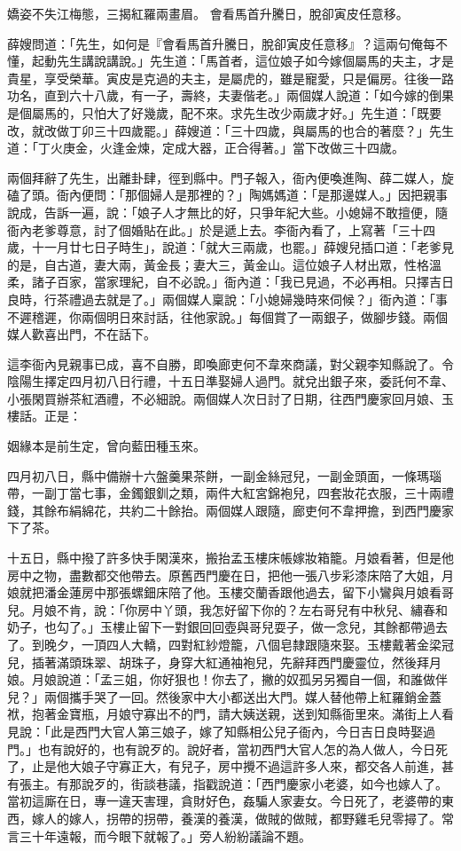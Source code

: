\begin{showcontents}{}
嬌姿不失江梅態，三揭紅羅兩畫眉。
會看馬首升騰日，脫卻寅皮任意移。

薛嫂問道：「先生，如何是『會看馬首升騰日，脫卻寅皮任意移』？這兩句俺每不懂，起動先生講說講說。」先生道：「馬首者，這位娘子如今嫁個屬馬的夫主，才是貴星，享受榮華。寅皮是克過的夫主，是屬虎的，雖是寵愛，只是偏房。往後一路功名，直到六十八歲，有一子，壽終，夫妻偕老。」兩個媒人說道：「如今嫁的倒果是個屬馬的，只怕大了好幾歲，配不來。求先生改少兩歲才好。」先生道：「既要改，就改做丁卯三十四歲罷。」薛嫂道：「三十四歲，與屬馬的也合的著麼？」先生道：「丁火庚金，火逢金煉，定成大器，正合得著。」當下改做三十四歲。

兩個拜辭了先生，出離卦肆，徑到縣中。門子報入，衙內便喚進陶、薛二媒人，旋磕了頭。衙內便問：「那個婦人是那裡的？」陶媽媽道：「是那邊媒人。」因把親事說成，告訴一遍，說：「娘子人才無比的好，只爭年紀大些。小媳婦不敢擅便，隨衙內老爹尊意，討了個婚貼在此。」於是遞上去。李衙內看了，上寫著「三十四歲，十一月廿七日子時生」，說道：「就大三兩歲，也罷。」薛嫂兒插口道：「老爹見的是，自古道，妻大兩，黃金長；妻大三，黃金山。這位娘子人材出眾，性格溫柔，諸子百家，當家理紀，自不必說。」衙內道：「我已見過，不必再相。只擇吉日良時，行茶禮過去就是了。」兩個媒人稟說：「小媳婦幾時來伺候？」衙內道：「事不遲稽遲，你兩個明日來討話，往他家說。」每個賞了一兩銀子，做腳步錢。兩個媒人歡喜出門，不在話下。

這李衙內見親事已成，喜不自勝，即喚廊吏何不韋來商議，對父親李知縣說了。令陰陽生擇定四月初八日行禮，十五日準娶婦人過門。就兌出銀子來，委託何不韋、小張閑買辦茶紅酒禮，不必細說。兩個媒人次日討了日期，往西門慶家回月娘、玉樓話。正是：

姻緣本是前生定，曾向藍田種玉來。

四月初八日，縣中備辦十六盤羹果茶餅，一副金絲冠兒，一副金頭面，一條瑪瑙帶，一副丁當七事，金鐲銀釧之類，兩件大紅宮錦袍兒，四套妝花衣服，三十兩禮錢，其餘布絹綿花，共約二十餘抬。兩個媒人跟隨，廊吏何不韋押擔，到西門慶家下了茶。

十五日，縣中撥了許多快手閑漢來，搬抬孟玉樓床帳嫁妝箱籠。月娘看著，但是他房中之物，盡數都交他帶去。原舊西門慶在日，把他一張八步彩漆床陪了大姐，月娘就把潘金蓮房中那張螺鈿床陪了他。玉樓交蘭香跟他過去，留下小鸞與月娘看哥兒。月娘不肯，說：「你房中丫頭，我怎好留下你的？左右哥兒有中秋兒、繡春和奶子，也勾了。」玉樓止留下一對銀回回壺與哥兒耍子，做一念兒，其餘都帶過去了。到晚夕，一頂四人大轎，四對紅紗燈籠，八個皂隸跟隨來娶。玉樓戴著金梁冠兒，插著滿頭珠翠、胡珠子，身穿大紅通袖袍兒，先辭拜西門慶靈位，然後拜月娘。月娘說道：「孟三姐，你好狠也！你去了，撇的奴孤另另獨自一個，和誰做伴兒？」兩個攜手哭了一回。然後家中大小都送出大門。媒人替他帶上紅羅銷金蓋袱，抱著金寶瓶，月娘守寡出不的門，請大姨送親，送到知縣衙里來。滿街上人看見說：「此是西門大官人第三娘子，嫁了知縣相公兒子衙內，今日吉日良時娶過門。」也有說好的，也有說歹的。說好者，當初西門大官人怎的為人做人，今日死了，止是他大娘子守寡正大，有兒子，房中攪不過這許多人來，都交各人前進，甚有張主。有那說歹的，街談巷議，指戳說道：「西門慶家小老婆，如今也嫁人了。當初這廝在日，專一違天害理，貪財好色，姦騙人家妻女。今日死了，老婆帶的東西，嫁人的嫁人，拐帶的拐帶，養漢的養漢，做賊的做賊，都野雞毛兒零撏了。常言三十年遠報，而今眼下就報了。」旁人紛紛議論不題。


\end{showcontents}
